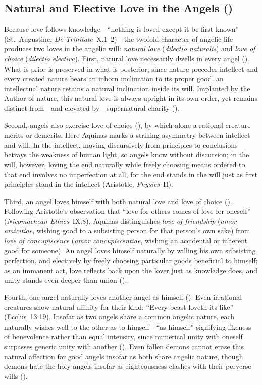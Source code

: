 \subsection{Natural and Elective Love in the Angels ()}

Because love follows knowledge---``nothing is loved except it be first known'' (St.~Augustine, \emph{De Trinitate}~X.1--2)---the twofold character of angelic life produces two loves in the angelic will: \emph{natural love} (\emph{dilectio naturalis}) and \emph{love of choice} (\emph{dilectio electiva}). First, natural love necessarily dwells in every angel (). What is prior is preserved in what is posterior; since nature precedes intellect and every created nature bears an inborn inclination to its proper good, an intellectual nature retains a natural inclination inside its will. Implanted by the Author of nature, this natural love is always upright in its own order, yet remains distinct from---and elevated by---supernatural charity ().

Second, angels also exercise love of choice (), by which alone a rational creature merits or demerits. Here Aquinas marks a striking asymmetry between intellect and will. In the intellect, moving discursively from principles to conclusions betrays the weakness of human light, so angels know without discursion; in the will, however, loving the end naturally while freely choosing means ordered to that end involves no imperfection at all, for the end stands in the will just as first principles stand in the intellect (Aristotle, \emph{Physics}~II).

Third, an angel loves himself with both natural love and love of choice (). Following Aristotle's observation that ``love for others comes of love for oneself'' (\emph{Nicomachean Ethics}~IX.8), Aquinas distinguishes \emph{love of friendship} (\emph{amor amicitiae}, wishing good to a subsisting person for that person's own sake) from \emph{love of concupiscence} (\emph{amor concupiscentiae}, wishing an accidental or inherent good for someone). An angel loves himself naturally by willing his own subsisting perfection, and electively by freely choosing particular goods beneficial to himself; as an immanent act, love reflects back upon the lover just as knowledge does, and unity stands even deeper than union ().

Fourth, one angel naturally loves another angel as himself (). Even irrational creatures show natural affinity for their kind: ``Every beast loveth its like'' (Ecclus~13:19). Insofar as two angels share a common angelic nature, each naturally wishes well to the other as to himself---``as himself'' signifying likeness of benevolence rather than equal intensity, since numerical unity with oneself surpasses generic unity with another (). Even fallen demons cannot erase this natural affection for good angels insofar as both share angelic nature, though demons hate the holy angels insofar as righteousness clashes with their perverse wills ().

